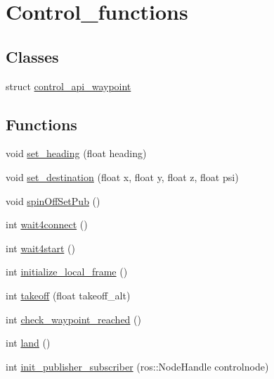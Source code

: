 \hypertarget{group__control__functions}{}\section{Control\+\_\+functions}
\label{group__control__functions}
\subsection*{Classes}
\begin{DoxyCompactItemize}
\item 
struct \mbox{\hyperlink{structcontrol__api__waypoint}{control\+\_\+api\+\_\+waypoint}}
\end{DoxyCompactItemize}
\subsection*{Functions}
\begin{DoxyCompactItemize}
\item 
void \mbox{\hyperlink{group__control__functions_ga92292bc0da7dd2a58edf8e9aa10eb682}{set\+\_\+heading}} (float heading)
\item 
void \mbox{\hyperlink{group__control__functions_gab90a45d8b081ba329b9d0f886adbc2d5}{set\+\_\+destination}} (float x, float y, float z, float psi)
\item 
void \mbox{\hyperlink{group__control__functions_ga60eb8f08f1ac190352a7ad6532e4f70e}{spin\+Off\+Set\+Pub}} ()
\item 
int \mbox{\hyperlink{group__control__functions_ga1921a30d419eb397f7e40875217b45d1}{wait4connect}} ()
\item 
int \mbox{\hyperlink{group__control__functions_gab6fe46f505ab9804b4ed98b96286a811}{wait4start}} ()
\item 
int \mbox{\hyperlink{group__control__functions_ga2a1100bb15673a9322c5be3bb8e9999f}{initialize\+\_\+local\+\_\+frame}} ()
\item 
int \mbox{\hyperlink{group__control__functions_gac0aa671c99c09687515ec5bb8891c7d2}{takeoff}} (float takeoff\+\_\+alt)
\item 
int \mbox{\hyperlink{group__control__functions_ga54abc3f6eae022a8710bc0c2e1c54fbe}{check\+\_\+waypoint\+\_\+reached}} ()
\item 
int \mbox{\hyperlink{group__control__functions_ga52a11a139e56315de52d2ab439b0d203}{land}} ()
\item 
int \mbox{\hyperlink{group__control__functions_gae693b071b5392f9253cdfc1f4f362fcc}{init\+\_\+publisher\+\_\+subscriber}} (ros\+::\+Node\+Handle controlnode)
\end{DoxyCompactItemize}


